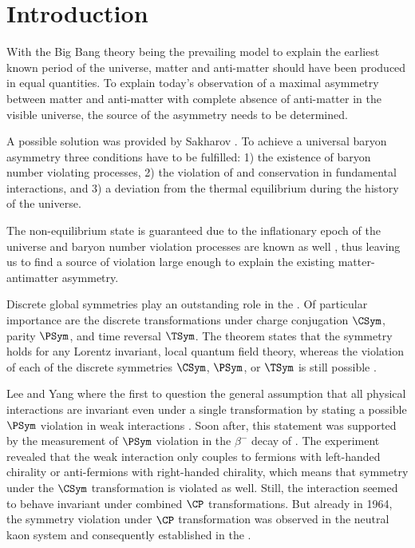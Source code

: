 
\chapter{Introduction}
\label{ch:introduction}

With the Big Bang theory being the prevailing model to explain the earliest
known period of the universe, matter and anti-matter should have been produced
in equal quantities. To explain today's observation of a maximal asymmetry
between matter and anti-matter with complete absence of anti-matter in the
visible universe, the source of the asymmetry needs to be determined.

A possible solution was provided by Sakharov \cite{Sakharov:1967dj}. To achieve
a universal baryon asymmetry three conditions have to be fulfilled: 1) the
existence of baryon number violating processes, 2) the violation of \CSym and
\CP conservation in fundamental interactions, and 3) a deviation from the
thermal equilibrium during the history of the universe.

The non-equilibrium state is guaranteed due to the inflationary epoch of the
universe and baryon number violation processes are known as well
\cite{tHooft:1976up,Rubakov:1996vz}, thus leaving us to find a source of \CP
violation large enough to explain the existing matter-antimatter asymmetry.

Discrete global symmetries play an outstanding role in the \SM. Of particular
importance are the discrete transformations under charge conjugation $\CSym$,
parity $\PSym$, and time reversal $\TSym$. The \CPT theorem states that the \CPT
symmetry holds for any Lorentz invariant, local quantum field theory, whereas
the violation of each of the discrete symmetries $\CSym$, $\PSym$, or $\TSym$ is
still possible \cite{set:cpt}.

Lee and Yang where the first to question the general assumption that all
physical interactions are invariant even under a single transformation by
stating a possible $\PSym$ violation in weak interactions \cite{Lee:1956qn}.
Soon after, this statement was supported by the measurement of $\PSym$ violation
in the $\beta^{-}$ decay of \cobaltsixty \cite{Wu:1957my}. The experiment
revealed that the weak interaction only couples to fermions with left-handed
chirality or anti-fermions with right-handed chirality, which means that
symmetry under the $\CSym$ transformation is violated as well. Still, the
interaction seemed to behave invariant under combined $\CP$ transformations. But
already in 1964, the symmetry violation under $\CP$ transformation was observed
in the neutral kaon system and consequently established in the \SM
\cite{Christenson:1964fg}.

